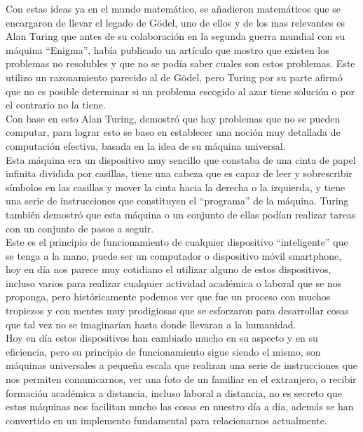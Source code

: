 \documentclass{article}
\begin{document}
Con estas ideas ya en el mundo matemático, se añadieron matemáticos que se encargaron de llevar el legado de Gödel, uno de ellos y de los mas relevantes es Alan Turing que antes de su colaboración en la segunda guerra mundial con su máquina “Enigma”, había publicado un artículo que mostro que existen los problemas no resolubles y que no se podía saber cuales son estos problemas. Este utilizo un razonamiento parecido al de Gödel, pero Turing por su parte afirmó que no es posible determinar si un problema escogido al azar tiene solución o por el contrario no la tiene.\\
Con base en esto Alan Turing, demostró que hay problemas que no se pueden computar, para lograr esto se baso en establecer una noción muy detallada de computación efectiva, basada en la idea de su máquina universal.\\
Esta máquina era un dispositivo muy sencillo que constaba de una cinta de papel infinita dividida por casillas, tiene una cabeza que es capaz de leer y sobrescribir símbolos en las casillas y mover la cinta hacia la derecha o la izquierda, y tiene una serie de instrucciones que constituyen el “programa” de la máquina. Turing también demostró que esta máquina o un conjunto de ellas podían realizar tareas con un conjunto de pasos a seguir.\\
Este es el principio de funcionamiento de cualquier dispositivo “inteligente” que se tenga a la mano, puede ser un computador o dispositivo móvil smartphone, hoy en día nos parece muy cotidiano el utilizar alguno de estos dispositivos, incluso varios para realizar cualquier actividad académica o laboral que se nos proponga, pero históricamente podemos ver que fue un proceso con muchos tropiezos y con mentes muy prodigiosas que se esforzaron para desarrollar cosas que tal vez no se imaginarían hasta donde llevaran a la humanidad.\\
Hoy en día estos dispositivos han cambiado mucho en su aspecto y en su eficiencia, pero su principio de funcionamiento sigue siendo el mismo, son máquinas universales a pequeña escala que realizan una serie de instrucciones que nos permiten comunicarnos, ver una foto de un familiar en el extranjero, o recibir formación académica a distancia, incluso laboral a distancia, no es secreto que estas máquinas nos facilitan mucho las cosas en nuestro día a día, además se han convertido en un implemento fundamental para relacionarnos actualmente.\\
\end{document}
